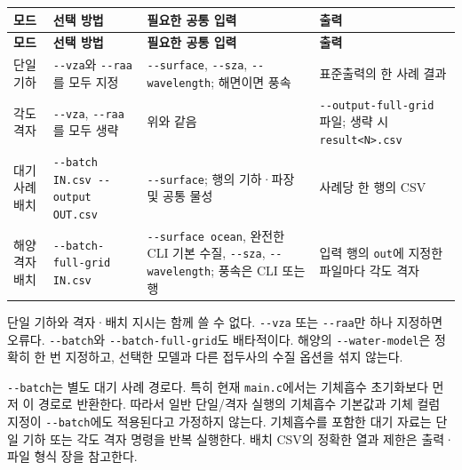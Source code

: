 {\TableFont
\begin{longtable}{@{}>{\raggedright\arraybackslash}p{}>{\raggedright\arraybackslash}p{}>{\raggedright\arraybackslash}p{}>{\raggedright\arraybackslash}p{}@{}}
\toprule
\textbf{모드} & \textbf{선택 방법} & \textbf{필요한 공통 입력} & \textbf{출력} \\
\midrule
\endfirsthead
\toprule
\textbf{모드} & \textbf{선택 방법} & \textbf{필요한 공통 입력} & \textbf{출력} \\
\midrule
\endhead
\bottomrule
\endfoot
단일 기하 & \texttt{-\allowbreak{}-\allowbreak{}vza}와 \texttt{-\allowbreak{}-\allowbreak{}raa}를 모두 지정 & \texttt{-\allowbreak{}-\allowbreak{}surface}, \texttt{-\allowbreak{}-\allowbreak{}sza}, \texttt{-\allowbreak{}-\allowbreak{}wavelength}; 해면이면 풍속 & 표준출력의 한 사례 결과 \\
각도 격자 & \texttt{-\allowbreak{}-\allowbreak{}vza}, \texttt{-\allowbreak{}-\allowbreak{}raa}를 모두 생략 & 위와 같음 & \texttt{-\allowbreak{}-\allowbreak{}output-\allowbreak{}full-\allowbreak{}grid} 파일; 생략 시 \texttt{result<N>.\allowbreak{}csv} \\
대기 사례 배치 & \texttt{-\allowbreak{}-\allowbreak{}batch IN.\allowbreak{}csv -\allowbreak{}-\allowbreak{}output OUT.\allowbreak{}csv} & \texttt{-\allowbreak{}-\allowbreak{}surface}; 행의 기하·파장 및 공통 물성 & 사례당 한 행의 CSV \\
해양 격자 배치 & \texttt{-\allowbreak{}-\allowbreak{}batch-\allowbreak{}full-\allowbreak{}grid IN.\allowbreak{}csv} & \texttt{-\allowbreak{}-\allowbreak{}surface ocean}, 완전한 CLI 기본 수질, \texttt{-\allowbreak{}-\allowbreak{}sza}, \texttt{-\allowbreak{}-\allowbreak{}wavelength}; 풍속은 CLI 또는 행 & 입력 행의 \texttt{out}에 지정한 파일마다 각도 격자 \\
\end{longtable}
}

단일 기하와 격자·배치 지시는 함께 쓸 수 없다. \texttt{-\allowbreak{}-\allowbreak{}vza} 또는 \texttt{-\allowbreak{}-\allowbreak{}raa}만 하나 지정하면 오류다. \texttt{-\allowbreak{}-\allowbreak{}batch}와 \texttt{-\allowbreak{}-\allowbreak{}batch-\allowbreak{}full-\allowbreak{}grid}도 배타적이다. 해양의 \texttt{-\allowbreak{}-\allowbreak{}water-\allowbreak{}model}은 정확히 한 번 지정하고, 선택한 모델과 다른 접두사의 수질 옵션을 섞지 않는다.

\texttt{-\allowbreak{}-\allowbreak{}batch}는 별도 대기 사례 경로다. 특히 현재 \texttt{main.\allowbreak{}c}에서는 기체흡수 초기화보다 먼저 이 경로로 반환한다. 따라서 일반 단일/격자 실행의 기체흡수 기본값과 기체 컬럼 지정이 \texttt{-\allowbreak{}-\allowbreak{}batch}에도 적용된다고 가정하지 않는다. 기체흡수를 포함한 대기 자료는 단일 기하 또는 각도 격자 명령을 반복 실행한다. 배치 CSV의 정확한 열과 제한은 출력·파일 형식 장을 참고한다.

